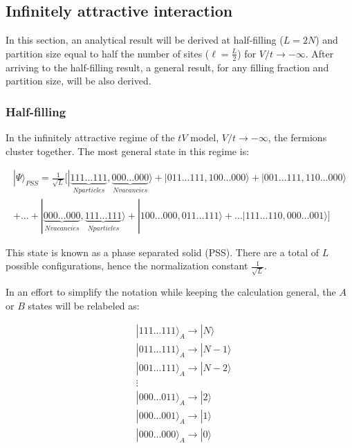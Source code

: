 	\subsection{Infinitely attractive interaction}
	In this section, an analytical result will be derived at half-filling ($L = 2N$) and partition size equal to half the number of sites ($\ell = \frac{L}{2}$) for $V/t \to - \infty$. After arriving to the half-filling result, a general result, for any filling fraction and partition size, will be also derived. 
	
	\subsubsection{Half-filling}
	In the infinitely attractive regime of the $tV$ model, $V/t \to -\infty$, the fermions cluster together. The most general state in this regime is:
	
\begin{equation}
\begin{aligned}	
| \Psi \rangle_{PSS} = \frac{1}{\sqrt{L}} [ | \underbrace{111...111}_{N particles} , \underbrace{000...000}_{N vacancies} \rangle + |011...111, 100...000 \rangle + |001...111, 110...000 \rangle  \\
+ ...  + |\underbrace{000...000}_{N vacancies}, \underbrace{111...111}_{N particles} \rangle + |100...000, 011...111 \rangle + ... |111...110, 000...001 \rangle ]
\end{aligned}
\end{equation}

This state is known as a phase separated solid (PSS). There are a total of $L$ possible configurations, hence the normalization constant $\frac{1}{\sqrt{L}}$. 

In an effort to simplify the notation while keeping the calculation general, the $A$ or $B$ states will be relabeled as:

\begin {align*}
&| 111...111 \rangle_{A} \to | N \rangle \\
&| 011...111 \rangle_{A} \to | N-1 \rangle \\
&| 001...111 \rangle_{A} \to | N-2 \rangle \\
&\vdots \\
&| 000...011 \rangle_{A} \to | 2 \rangle \\
&| 000...001 \rangle_{A} \to | 1 \rangle \\
&| 000...000 \rangle_{A} \to | 0 \rangle 
\end {align*}


